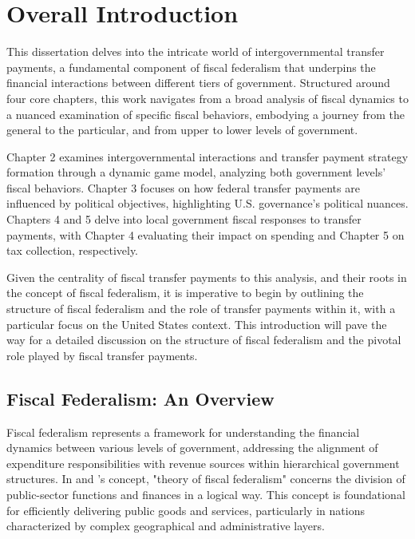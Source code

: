
\chapter{Overall Introduction} \label{chapter1:Introduction---about Fiscal Federalism and Intergovernmental Transfer}

This dissertation delves into the intricate world of intergovernmental transfer payments, a fundamental component of fiscal federalism that underpins the financial interactions between different tiers of government. Structured around four core chapters, this work navigates from a broad analysis of fiscal dynamics to a nuanced examination of specific fiscal behaviors, embodying a journey from the general to the particular, and from upper to lower levels of government.

Chapter 2 examines intergovernmental interactions and transfer payment strategy formation through a dynamic game model, analyzing both government levels' fiscal behaviors. Chapter 3 focuses on how federal transfer payments are influenced by political objectives, highlighting U.S. governance's political nuances. Chapters 4 and 5 delve into local government fiscal responses to transfer payments, with Chapter 4 evaluating their impact on spending and Chapter 5 on tax collection, respectively.


Given the centrality of fiscal transfer payments to this analysis, and their roots in the concept of fiscal federalism, it is imperative to begin by outlining the structure of fiscal federalism and the role of transfer payments within it, with a particular focus on the United States context. This introduction will pave the way for a detailed discussion on the structure of fiscal federalism and the pivotal role played by fiscal transfer payments.

\section{Fiscal Federalism: An Overview}

Fiscal federalism represents a framework for understanding the financial dynamics between various levels of government, addressing the alignment of expenditure responsibilities with revenue sources within hierarchical government structures. In \textcite{musgrave1971economics} and \textcite{oates1972fiscal}'s concept, "theory of fiscal federalism" concerns the division of public-sector functions and finances in a logical way. This concept is foundational for efficiently delivering public goods and services, particularly in nations characterized by complex geographical and administrative layers.

